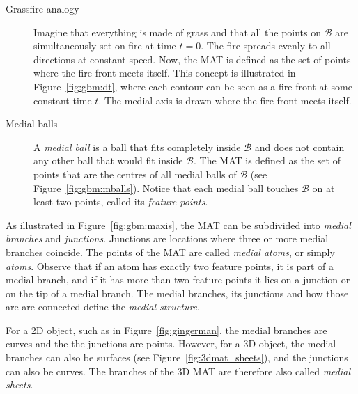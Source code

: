 \begin{description}
	\item[Grassfire analogy]
	Imagine that everything is made of grass and that all the points on $\mathcal{B}$ are simultaneously set on fire at time $t=0$. 
	The fire spreads evenly to all directions at constant speed. 
	Now, the MAT is defined as the set of points where the fire front meets itself. 
	This concept is illustrated in Figure~\ref{fig:gbm:dt}, where each contour can be seen as a fire front at some constant time $t$. The medial axis is drawn where the fire front meets itself.
	\item[Medial balls]
	A \emph{medial ball} is a ball that fits completely inside $\mathcal{B}$ and does not contain any other ball that would fit inside $\mathcal{B}$. 
	The MAT is defined as the set of points that are the centres of all medial balls of $\mathcal{B}$ (see Figure~\ref{fig:gbm:mballs}). 
	Notice that each medial ball touches $\mathcal{B}$ on at least two points, called its \emph{feature points}. 
\end{description}

As illustrated in Figure~\ref{fig:gbm:maxis}, the MAT can be subdivided into \emph{medial branches} and \emph{junctions}. 
Junctions are locations where three or more medial branches coincide. 
The points of the MAT are called \emph{medial atoms}, or simply \emph{atoms}. 
Observe that if an atom has exactly two feature points, it is part of a medial branch, and if it has more than two feature points it lies on a junction or on the tip of a medial branch. 
The medial branches, its junctions and how those are are connected define the \emph{medial structure}.

For a 2D object, such as in Figure~\ref{fig:gingerman}, the medial branches are curves and the the junctions are points. 
However, for a 3D object, the medial branches can also be surfaces (see Figure~\ref{fig:3dmat_sheets}), and the junctions can also be curves.
The branches of the 3D MAT are therefore also called \emph{medial sheets}.

